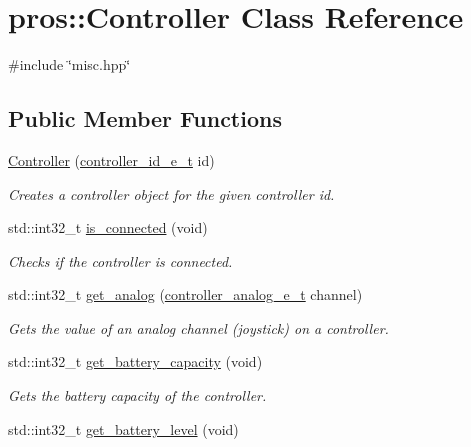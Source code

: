 \hypertarget{classpros_1_1Controller}{}\section{pros\+:\+:Controller Class Reference}
\label{classpros_1_1Controller}


{\ttfamily \#include \char`\"{}misc.\+hpp\char`\"{}}

\subsection*{Public Member Functions}
\begin{DoxyCompactItemize}
\item 
\hyperlink{classpros_1_1Controller_ae9d9ead11894048b383e9e82ef46d5ad}{Controller} (\hyperlink{misc_8h_af1323f00203099060d46f722b1fbd460}{controller\+\_\+id\+\_\+e\+\_\+t} id)
\begin{DoxyCompactList}\small\item\em Creates a controller object for the given controller id. \end{DoxyCompactList}\item 
std\+::int32\+\_\+t \hyperlink{classpros_1_1Controller_a1a013e9cf1979487f2daabcd729d3ecb}{is\+\_\+connected} (void)
\begin{DoxyCompactList}\small\item\em Checks if the controller is connected. \end{DoxyCompactList}\item 
std\+::int32\+\_\+t \hyperlink{classpros_1_1Controller_ace3038684aa3cf14f06279c54eeb1105}{get\+\_\+analog} (\hyperlink{misc_8h_a8bdd0963e2bc0d4fbe03435eee8a5ca5}{controller\+\_\+analog\+\_\+e\+\_\+t} channel)
\begin{DoxyCompactList}\small\item\em Gets the value of an analog channel (joystick) on a controller. \end{DoxyCompactList}\item 
std\+::int32\+\_\+t \hyperlink{classpros_1_1Controller_a7d85ecacfd46161ddb2be08d856ca130}{get\+\_\+battery\+\_\+capacity} (void)
\begin{DoxyCompactList}\small\item\em Gets the battery capacity of the controller. \end{DoxyCompactList}\item 
std\+::int32\+\_\+t \hyperlink{classpros_1_1Controller_a8fd8b131f13f2f7702b5299dab82fdaf}{get\+\_\+battery\+\_\+level} (void)

\end{DoxyCompactItemize}
